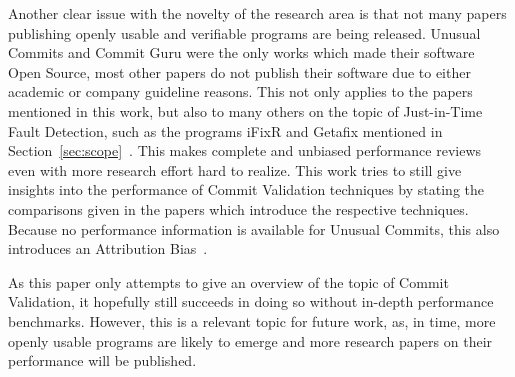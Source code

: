 Another clear issue with the novelty of the research area is that not many papers publishing openly usable and verifiable programs are being released. Unusual Commits and Commit Guru were the only works which made their software Open Source, most other papers do not publish their software due to either academic or company guideline reasons. This not only applies to the papers mentioned in this work, but also to many others on the topic of Just-in-Time Fault Detection, such as the programs iFixR and Getafix mentioned in Section~\ref{sec:scope}~\cite{Koyuncu2019,Bader2019}. This makes complete and unbiased performance reviews even with more research effort hard to realize. This work tries to still give insights into the performance of Commit Validation techniques by stating the comparisons given in the papers which introduce the respective techniques. Because no performance information is available for Unusual Commits, this also introduces an Attribution Bias~\cite{Goyal2017}.

As this paper only attempts to give an overview of the topic of Commit Validation, it hopefully still succeeds in doing so without in-depth performance benchmarks. However, this is a relevant topic for future work, as, in time, more openly usable programs are likely to emerge and more research papers on their performance will be published.





